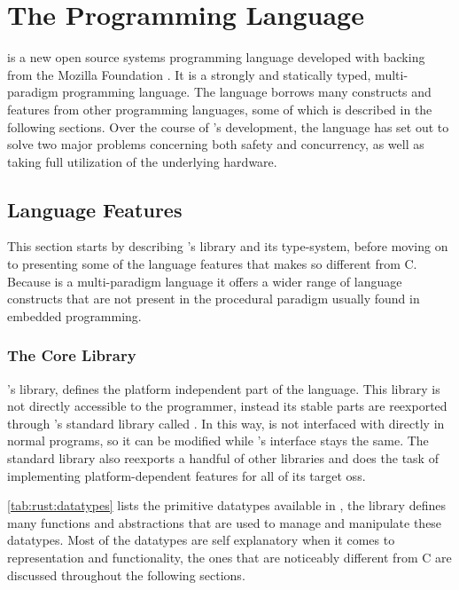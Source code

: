 
\section{The \rust Programming Language} %
\label{sub:the_rust_programming_language}

\rust \cite{web:rust_lang} is a new open source systems programming language developed with backing from the Mozilla Foundation \cite{web:mozilla_foundation}.
It is a strongly and statically typed, multi-paradigm programming language.
The language borrows many constructs and features from other programming languages, some of which is described in the following sections.
Over the course of \rust's development, the language has set out to solve two major problems concerning both safety and concurrency, as well as taking full utilization of the underlying hardware.

\subsection{Language Features}
\label{ssub:rust:features}

This section starts by describing \rust's \core library and its type-system, before moving on to presenting some of the language features that makes \rust so different from C.
Because \rust is a multi-paradigm language it offers a wider range of language constructs that are not present in the procedural paradigm usually found in embedded programming.

\subsubsection{The Core Library}

\rust's \core library, defines the platform independent part of the language.
This library is not directly accessible to the programmer, instead its stable parts are reexported through \rust's standard library called \std.
In this way, \core is not interfaced with directly in normal \rust programs, so it can be modified while \std's interface stays the same.
The standard library also reexports a handful of other libraries and does the task of implementing platform-dependent features for all of its target \glspl{os}.

\autoref{tab:rust:datatypes} lists the primitive datatypes available in \rust, the \core library defines many functions and abstractions that are used to manage and manipulate these datatypes.
Most of the datatypes are self explanatory when it comes to representation and functionality, the ones that are noticeably different from C are discussed throughout the following sections.

